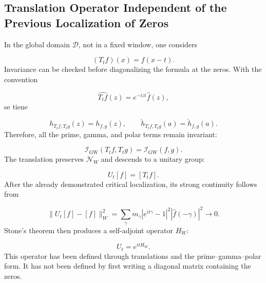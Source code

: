 \subsection{Translation Operator Independent of the Previous Localization of Zeros}
In the global domain \(\mathcal D\), not in a fixed window, one considers\par
\[
(T_tf)(x)=f(x-t).
\]
Invariance can be checked before diagonalizing the formula at the zeros. With the convention\par
\[
\widehat{T_tf}(z)
=
e^{-izt}\widehat f(z),
\]
se tiene\par
\[
h_{T_tf,T_tg}(z)=h_{f,g}(z),
\qquad
\check h_{T_tf,T_tg}(a)=\check h_{f,g}(a).
\]
Therefore, all the prime, gamma, and polar terms remain invariant:\par
\[
\mathscr I_{\mathrm{GW}}(T_tf,T_tg)
=
\mathscr I_{\mathrm{GW}}(f,g).
\]
The translation preserves \(\mathcal N_W\) and descends to a unitary group:\par
\[
U_t[f]=[T_tf].
\]
After the already demonstrated critical localization, its strong continuity follows from\par
\[
\|U_t[f]-[f]\|_W^2
=
\sum_\gamma
m_\gamma
\left|e^{it\gamma}-1\right|^2
\left|\widehat f(-\gamma)\right|^2
\longrightarrow0.
\]
Stone's theorem then produces a self-adjoint operator \(H_W\):\par
\[
U_t=e^{itH_W}.
\]
This operator has been defined through translations and the prime--gamma--polar form. It has not been defined by first writing a diagonal matrix containing the zeros.\par
{}
